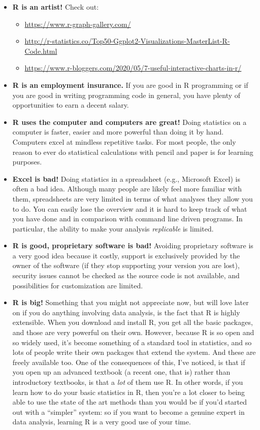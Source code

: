\documentclass[
  12pt,
  oneside]{book}
\providecommand{\tightlist}{%
  \setlength{\itemsep}{0pt}\setlength{\parskip}{0pt}}
\theoremstyle{definition}
\theoremstyle{definition}
\theoremstyle{definition}
\theoremstyle{definition}
\theoremstyle{remark}
\begin{document}
\begin{itemize}
\tightlist
\item
  \textbf{R is an artist!} Check out:

  \begin{itemize}
  \tightlist
  \item
    \url{https://www.r-graph-gallery.com/}
  \item
    \url{http://r-statistics.co/Top50-Ggplot2-Visualizations-MasterList-R-Code.html}
  \item
    \url{https://www.r-bloggers.com/2020/05/7-useful-interactive-charts-in-r/}
  \end{itemize}
\item
  \textbf{R is an employment insurance.} If you are good in R programming or if you are good in writing programming code in general, you have plenty of opportunities to earn a decent salary.
\item
  \textbf{R uses the computer and computers are great!} Doing statistics on a computer is faster, easier and more powerful than doing it by hand. Computers excel at mindless repetitive tasks. For most people, the only reason to ever do statistical calculations with pencil and paper is for learning purposes.
\item
  \textbf{Excel is bad!} Doing statistics in a spreadsheet (e.g., Microsoft Excel) is often a bad idea. Although many people are likely feel more familiar with them, spreadsheets are very limited in terms of what analyses they allow you to do. You can easily lose the overview and it is hard to keep track of what you have done and in comparison with command line driven programs. In particular, the ability to make your analysis \emph{replicable} is limited.
\item
  \textbf{R is good, proprietary software is bad!} Avoiding proprietary software is a very good idea because it costly, support is exclusively provided by the owner of the software (if they stop supporting your version you are lost), security issues cannot be checked as the source code is not available, and possibilities for customization are limited.
\item
  \textbf{R is big!} Something that you might not appreciate now, but will love later on if you do anything involving data analysis, is the fact that R is highly extensible. When you download and install R, you get all the basic packages, and those are very powerful on their own. However, because R is so open and so widely used, it's become something of a standard tool in statistics, and so lots of people write their own packages that extend the system. And these are freely available too. One of the consequences of this, I've noticed, is that if you open up an advanced textbook (a recent one, that is) rather than introductory textbooks, is that a \emph{lot} of them use R. In other words, if you learn how to do your basic statistics in R, then you're a lot closer to being able to use the state of the art methods than you would be if you'd started out with a ``simpler'' system: so if you want to become a genuine expert in data analysis, learning R is a very good use of your time.

\end{itemize}
\end{document}
